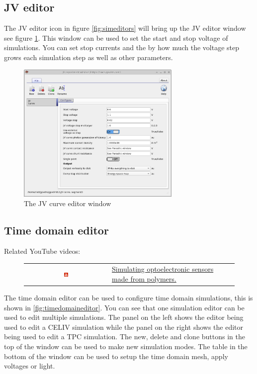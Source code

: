 \subsection{JV editor}
The JV editor icon in figure \ref{fig:simeditors} will bring up the JV editor window see figure \ref{fig:jvcurveeditor}. This window can be used to set the start and stop voltage of simulations. You can set stop currents and the by how much the voltage step grows each simulation step as well as other parameters.

\begin{figure}[H]
\centering
\includegraphics[width=0.7\textwidth,height=0.5\textwidth]{./images/jv_editor.png}
\caption{The JV curve editor window}
\label{fig:jvcurveeditor}
\end{figure}

\subsection{Time domain editor}
Related YouTube videos:
\begin{figure}[H]

\begin{tabular}{ c l }

\includegraphics[width=0.05\textwidth]{./images/youtube.png}

&
\href{https://www.youtube.com/watch?v=D7yJLFmTAVQ}{Simulating optoelectronic sensors made from polymers.}

\end{tabular}
\end{figure}

The time domain editor can be used to configure time domain simulations, this is shown in \ref{fig:timedomaineditor}.  You can see that one simulation editor can be used to edit multiple simulations.  The panel on the left shows the editor being used to edit a CELIV simulation while the panel on the right shows the editor being used to edit a TPC simulation.  The new, delete and clone buttons in the top of the window can be used to make new simulation modes. The table in the bottom of the window can be used to setup the time domain mesh, apply voltages or light.

